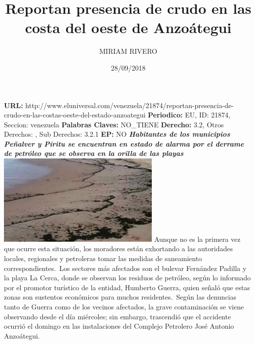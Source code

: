 \documentclass{article}%
\title{\textbf{Reportan presencia de crudo en las costa del oeste de Anzoátegui}}%
\author{MIRIAM RIVERO}%
\date{28/09/2018}%
\begin{document}
%
\normalsize%
\maketitle%
\textbf{URL: }%
http://www.eluniversal.com/venezuela/21874/reportan{-}presencia{-}de{-}crudo{-}en{-}las{-}costas{-}oeste{-}del{-}estado{-}anzoategui\newline%
%
\textbf{Periodico: }%
EU, %
ID: %
21874, %
Seccion: %
venezuela\newline%
%
\textbf{Palabras Claves: }%
NO\_TIENE\newline%
%
\textbf{Derecho: }%
3.2, %
Otros Derechos: %
, %
Sub Derechos: %
3.2.1\newline%
%
\textbf{EP: }%
NO\newline%
\newline%
%
\textbf{\textit{Habitantes de los municipios Peñalver y Píritu se encuentran en estado de alarma por el derrame de petróleo que se observa en la orilla de las playas}}%
\newline%
\newline%
%
\includegraphics[width=300px]{256.jpg}%
\newline%
%
Aunque no es la primera vez que ocurre esta situación, los moradores están exhortando a las autoridades locales, regionales y petroleras tomar las medidas de saneamiento correspondientes.~Los sectores más afectados son el bulevar Fernández Padilla y la playa La Cerca, donde se observan los residuos de petróleo, según lo informado por el promotor turístico de la entidad, Humberto Guerra, quien señaló que estas zonas son sustentos económicos para muchos residentes.~Según las denuncias tanto de Guerra como de los vecinos afectados, la grave contaminación se viene observando desde el día miércoles; sin embargo, trascendió que el accidente ocurrió el domingo en las instalaciones del Complejo Petrolero José Antonio Anzoátegui.%
\newline%
%
\end{document}
